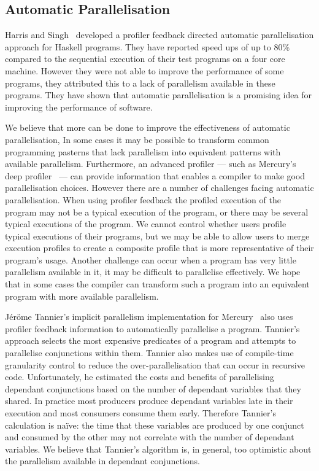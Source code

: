 \subsection{Automatic Parallelisation}
\label{sec:lit_automatic-parallelisation}

Harris and Singh~\cite{haskell-imp-par} developed a profiler feedback
directed automatic parallelisation approach for Haskell programs.
They have reported speed ups of up to 80\% compared to the sequential
execution of their test programs on a four core machine.
However they were not able to improve the performance of some
programs, they attributed this to a lack of parallelism
available in these programs.
They have shown that automatic parallelisation is a promising idea for
improving the performance of software.

We believe that more can be done to improve the effectiveness of
automatic parallelisation,
In some cases it may be possible to transform common programming
pasterns that lack parallelism into equivalent patterns with available
parallelism.
Furthermore, an advanced profiler --- such as Mercury's deep
profiler~\cite{conway:2001:mercury-deep} --- can provide information
that enables a compiler to make good parallelisation choices.
However there are a number of challenges facing automatic
parallelisation.
When using profiler feedback the profiled execution of the program may
not be a typical execution of the program, or there may be several
typical executions of the program.
We cannot control whether users profile typical executions of their
programs, but we may be able to allow users to merge execution
profiles to create a composite profile that is more representative of
their program's usage.
Another challenge can occur when a program has very little parallelism
available in it, it may be difficult to parallelise effectively.
We hope that in some cases the compiler can transform such a program
into an equivalent program with more available parallelism.

J\'er\"ome Tannier's implicit parallelism implementation for
Mercury~\cite{tannier} also uses profiler feedback information to
automatically parallelise a program.
Tannier's approach selects the most expensive predicates of a program
and attempts to parallelise conjunctions within them.
Tannier also makes use of compile-time granularity
control to reduce the over-parallelisation that can occur in recursive
code.
Unfortunately, he estimated the costs and benefits of parallelising
dependant conjunctions based on the number of dependant variables that
they shared.
In practice most producers produce dependant variables late in their
execution and most consumers consume them early.
Therefore Tannier's calculation is na\"ive: the time that these
variables are produced by one conjunct and consumed by the other may
not correlate with the number of dependant variables.
We believe that Tannier's algorithm is, in general, too optimistic
about the parallelism available in dependant conjunctions.

